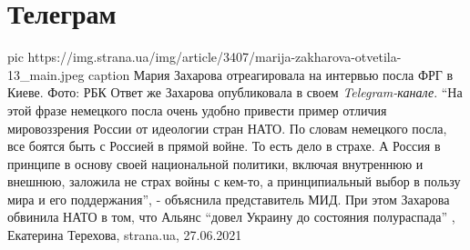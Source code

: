  
 
 
 
 
\chapter{Телеграм}
\label{sec:slova.telegram}

\ifcmt
  pic https://img.strana.ua/img/article/3407/marija-zakharova-otvetila-13_main.jpeg
  caption Мария Захарова отреагировала на интервью посла ФРГ в Киеве. Фото: РБК 
\fi
Ответ же Захарова опубликовала в своем \emph{Telegram-канале}.  \enquote{На этой фразе
немецкого посла очень удобно привести пример отличия мировоззрения России от
идеологии стран НАТО. По словам немецкого посла, все боятся быть с Россией в
прямой войне. То есть дело в страхе. А Россия в принципе в основу своей
национальной политики, включая внутреннюю и внешнюю, заложила не страх войны с
кем-то, а принципиальный выбор в пользу мира и его поддержания}, - объяснила
представитель МИД.  При этом Захарова обвинила НАТО в том, что Альянс
\enquote{довел Украину до состояния полураспада}
, 
Екатерина Терехова, strana.ua, 27.06.2021
